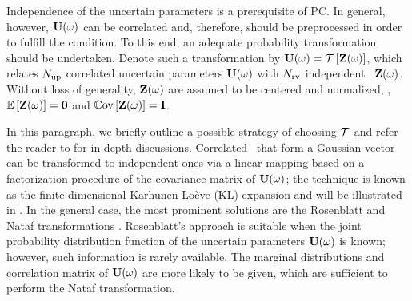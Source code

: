 Independence of the uncertain parameters is a prerequisite of PC. In general, however, $\mathbf{U}(\omega)$ can be correlated and, therefore, should be preprocessed in order to fulfill the condition. To this end, an adequate probability transformation should be undertaken. Denote such a transformation by $\vU(\o) = \oTransform{\vZ(\o)}$, which relates ${N_\text{up}}$ correlated uncertain parameters $\mathbf{U}(\omega)$ with ${N_\text{rv}}$ independent \rvs\ $\mathbf{Z}(\omega)$. Without loss of generality, $\mathbf{Z}(\omega)$ are assumed to be centered and normalized, \ie, $\oExp{\vZ(\o)} = \mZero$ and $\oCov{\vZ(\o)} = \mI$.

In this paragraph, we briefly outline a possible strategy of choosing $\oTransform$ and refer the reader to \cite{xiu2010, eldred2009} for in-depth discussions. Correlated \rvs\ that form a Gaussian vector can be transformed to independent ones via a linear mapping based on a factorization procedure of the covariance matrix of $\mathbf{U}(\omega)$; the technique is known as the finite-dimensional Karhunen-Lo\`{e}ve (KL) expansion and will be illustrated in . In the general case, the most prominent solutions are the Rosenblatt and Nataf transformations \cite{eldred2009}. Rosenblatt's approach is suitable when the joint probability distribution function of the uncertain parameters $\mathbf{U}(\omega)$ is known; however, such information is rarely available. The marginal distributions and correlation matrix of $\mathbf{U}(\omega)$ are more likely to be given, which are sufficient to perform the Nataf transformation.
